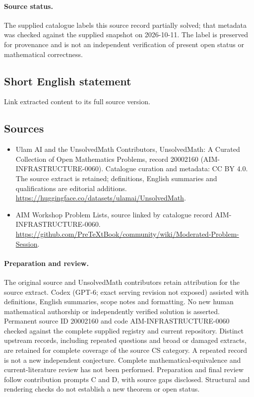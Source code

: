 \documentclass[11pt]{article}
\begin{document}
\paragraph{Source status.}
The supplied catalogue labels this source record partially solved; that metadata was checked against the supplied snapshot on 2026-10-11. The label is preserved for provenance and is not an independent verification of present open status or mathematical correctness.
\subsection{Short English statement}
Link extracted content to its full source version.
\subsection{Sources}
\begin{itemize}
\item[\hypertarget{source:20002160:1}{S1}] Ulam AI and the UnsolvedMath Contributors, UnsolvedMath: A Curated Collection of Open Mathematics Problems, record 20002160 (AIM-INFRASTRUCTURE-0060). Catalogue curation and metadata: CC BY 4.0. The source extract is retained; definitions, English summaries and qualifications are editorial additions.
\url{https://huggingface.co/datasets/ulamai/UnsolvedMath}.
\item[\hypertarget{source:20002160:2}{S2}] AIM Workshop Problem Lists, source linked by catalogue record AIM-INFRASTRUCTURE-0060.
\url{https://github.com/PreTeXtBook/community/wiki/Moderated-Problem-Session}.
\end{itemize}
\paragraph{Preparation and review.}
The original source and UnsolvedMath contributors retain attribution for the source extract. Codex (GPT-6; exact serving revision not exposed) assisted with definitions, English summaries, scope notes and formatting. No new human mathematical authorship or independently verified solution is asserted. Permanent source ID 20002160 and code AIM-INFRASTRUCTURE-0060 checked against the complete supplied registry and current repository. Distinct upstream records, including repeated questions and broad or damaged extracts, are retained for complete coverage of the source CS category. A repeated record is not a new independent conjecture. Complete mathematical-equivalence and current-literature review has not been performed. Preparation and final review follow contribution prompts C and D, with source gaps disclosed. Structural and rendering checks do not establish a new theorem or open status.
\label{end:20002160}
\end{document}

